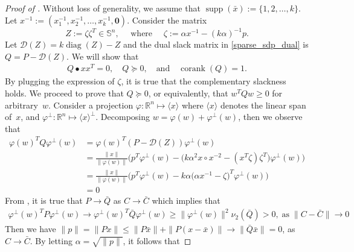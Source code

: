 \documentclass[11pt]{amsart}
\theoremstyle{plain}
\theoremstyle{definition}
\theoremstyle{remark}
\newcommand{\cD}{{\mathcal{D}}}
\newcommand{\RR}{\mathbb{R}}
\renewcommand{\SS}{{\mathbb{S}}}
\newcommand{\vzero}{\mathbf{0}}
\DeclareMathOperator{\corank}{corank}
\DeclareMathOperator{\diag}{diag}
\DeclareMathOperator{\supp}{supp}
\begin{document}
\begin{proof}[Proof of ]
		Without loss of generality, we assume that \(\supp(\bar x):=\{1,2,\dots,k\}\). Let \(x^{-1}:=(x^{-1}_1, x^{-1}_2,\dots, x^{-1}_k, \vzero)\).
        Consider the matrix 
		\begin{equation}
			Z := \zeta\zeta^T \in \SS^n,
			\quad\text{ where }\quad
			\zeta := \alpha x^{-1}  - (k\alpha)^{-1} p.
		\end{equation}
		Let $\cD(Z) = k\diag(Z) - Z$ and the dual slack matrix in \eqref{sparse_sdp_dual} is $Q = P  - \cD(Z)$.
		We will show that
		\begin{gather}\label{eq:complementarity}
			Q \bullet xx^T = 0, \quad
			Q \succeq 0,\quad\text{and}\quad\corank(Q)=1.
		\end{gather}
		By plugging the expression of $\zeta$, it is true that the complementary slackness holds.
		We proceed to prove that $ Q \succeq 0$,
		or equivalently,
		that $w^T Q w \geq 0$ for arbitrary~$w$. Consider a projection $\varphi: \RR^n \mapsto \langle  x\rangle$ where $\langle x\rangle$ denotes the linear span of~$x$, and $\varphi^\perp: \RR^n \mapsto \langle x\rangle^\perp$. Decomposing $w = \varphi(w) + \varphi^\perp(w)$, then we observe that
		\begin{equation}
			\begin{split}
				\varphi(w)^T Q \varphi^\perp(w) &= \varphi(w)^T (P - \cD(Z)) \varphi^\perp(w)\\
				&= \tfrac{\|x\|}{\|\varphi(w)\|}\Big(p^T \varphi^\perp(w)- \big(k\alpha^2 x\circ x^{-2} -(x^T\zeta) \zeta^T\big)\varphi^\perp(w)\Big)\\
				&= \tfrac{\|x\|}{\|\varphi(w)\|}\Big(p^T \varphi^\perp(w)-k \alpha\big(\alpha x^{-1} - \zeta\big)^T\varphi^\perp(w)\Big)\\
				&=0
			\end{split}
		\end{equation}
		From , it is true that \(P \rightarrow \bar Q\) as \(C\rightarrow\bar C\) which implies that
		\begin{equation}\label{eq:stable_P}
			\begin{split}
				\varphi^\perp(w)^T P \varphi^\perp(w)\rightarrow \varphi^\perp(w)^T \bar Q \varphi^\perp(w) \geq  \|\varphi^\perp(w)\|^2 \nu_2(\bar Q)>0,\; \text{as}\;\|C - \bar C\|\rightarrow 0
			\end{split}
		\end{equation}
		Then we have \(\|p\|=\|Px\|\leq\|P\bar x\| + \|P(x-\bar x)\| \rightarrow \|\bar Q \bar x\|=0\), as \(C\rightarrow\bar C\).
        By letting \(\alpha = \sqrt{\|p\|}\), it follows that

\end{proof}
\end{document}
